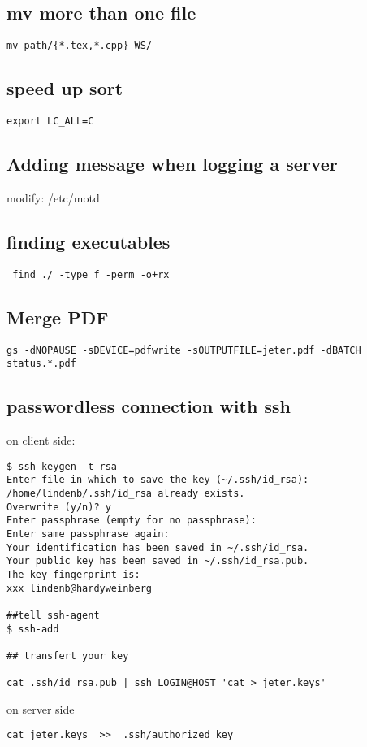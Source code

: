 \documentclass[12pt]{article}
\begin{document}
\subsection{mv more than one file}
\begin{verbatim}
mv path/{*.tex,*.cpp} WS/
\end{verbatim}

\subsection{speed up sort}
\begin{verbatim}
export LC_ALL=C
\end{verbatim}

\subsection{Adding message when logging a server}
modify: /etc/motd
\subsection{finding executables}
\begin{verbatim}
 find ./ -type f -perm -o+rx
\end{verbatim}

\subsection{Merge PDF}
\begin{verbatim}
gs -dNOPAUSE -sDEVICE=pdfwrite -sOUTPUTFILE=jeter.pdf -dBATCH status.*.pdf
\end{verbatim}

\subsection{passwordless connection with ssh}
on client side:
\begin{verbatim}
$ ssh-keygen -t rsa
Enter file in which to save the key (~/.ssh/id_rsa): 
/home/lindenb/.ssh/id_rsa already exists.
Overwrite (y/n)? y
Enter passphrase (empty for no passphrase): 
Enter same passphrase again: 
Your identification has been saved in ~/.ssh/id_rsa.
Your public key has been saved in ~/.ssh/id_rsa.pub.
The key fingerprint is:
xxx lindenb@hardyweinberg

##tell ssh-agent
$ ssh-add

## transfert your key

cat .ssh/id_rsa.pub | ssh LOGIN@HOST 'cat > jeter.keys'

\end{verbatim}
on server side
\begin{verbatim}
cat jeter.keys  >>  .ssh/authorized_key
\end{verbatim}
\end{document}
